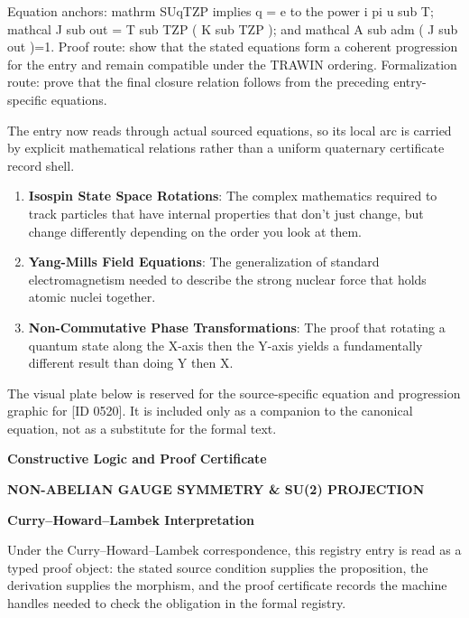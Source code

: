 Equation anchors: mathrm SUqTZP implies q = e to the power i pi u sub T; mathcal J sub out = T sub TZP ( K sub TZP ); and mathcal A sub adm ( J sub out )=1. Proof route: show that the stated equations form a coherent progression for the entry and remain compatible under the TRAWIN ordering. Formalization route: prove that the final closure relation follows from the preceding entry-specific equations.

The entry now reads through actual sourced equations, so its local arc is carried by explicit mathematical relations rather than a uniform quaternary certificate record shell.
\endgroup

\begin{enumerate}[leftmargin=1.6em,itemsep=6pt,topsep=4pt]
\item \textbf{Isospin State Space Rotations}: The complex mathematics required to track particles that have internal properties that don't just change, but change differently depending on the order you look at them.
\item \textbf{Yang-Mills Field Equations}: The generalization of standard electromagnetism needed to describe the strong nuclear force that holds atomic nuclei together.
\item \textbf{Non-Commutative Phase Transformations}: The proof that rotating a quantum state along the X-axis then the Y-axis yields a fundamentally different result than doing Y then X.
\end{enumerate}

\begingroup\footnotesize\sloppy
The visual plate below is reserved for the source-specific equation and progression graphic for [ID 0520]. It is included only as a companion to the canonical equation, not as a substitute for the formal text.
\par\endgroup
\ifTZPDarkEdition
{}
\fi

\clearpage
\begingroup\tzpsupportsetup
\noindent\textbf{\fontsize{10.8pt}{12.8pt}\selectfont [ID 0520] Constructive Logic and Proof Certificate}\par
\noindent\textbf{\fontsize{10pt}{12pt}\selectfont NON-ABELIAN GAUGE SYMMETRY \& SU(2) PROJECTION}\par
\vspace{0.45em}
\begingroup
\footnotesize
\setlength{\parskip}{0.22em}
\setlength{\parindent}{0pt}
\noindent\textbf{Curry--Howard--Lambek Interpretation}\par
Under the Curry--Howard--Lambek correspondence, this registry entry is read as a typed proof
object: the stated source condition supplies the proposition, the derivation supplies the
morphism, and the proof certificate records the machine handles needed to check the obligation
in the formal registry.


